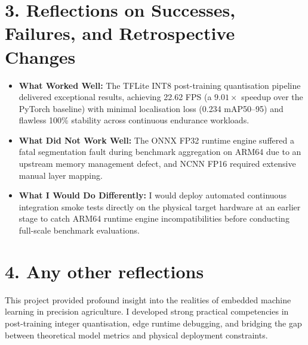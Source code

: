 \documentclass[11pt, a4paper]{article}
\begin{document}
\section*{3. Reflections on Successes, Failures, and Retrospective Changes}
\begin{itemize}
    \item \textbf{What Worked Well:} The TFLite INT8 post-training quantisation pipeline delivered exceptional results, achieving 22.62 FPS (a $9.01\times$ speedup over the PyTorch baseline) with minimal localisation loss (0.234 mAP50--95) and flawless 100\% stability across continuous endurance workloads.
    \item \textbf{What Did Not Work Well:} The ONNX FP32 runtime engine suffered a fatal segmentation fault during benchmark aggregation on ARM64 due to an upstream memory management defect, and NCNN FP16 required extensive manual layer mapping.
    \item \textbf{What I Would Do Differently:} I would deploy automated continuous integration smoke tests directly on the physical target hardware at an earlier stage to catch ARM64 runtime engine incompatibilities before conducting full-scale benchmark evaluations.
\end{itemize}

\section*{4. Any other reflections}
This project provided profound insight into the realities of embedded machine learning in precision agriculture. I developed strong practical competencies in post-training integer quantisation, edge runtime debugging, and bridging the gap between theoretical model metrics and physical deployment constraints.
\end{document}
